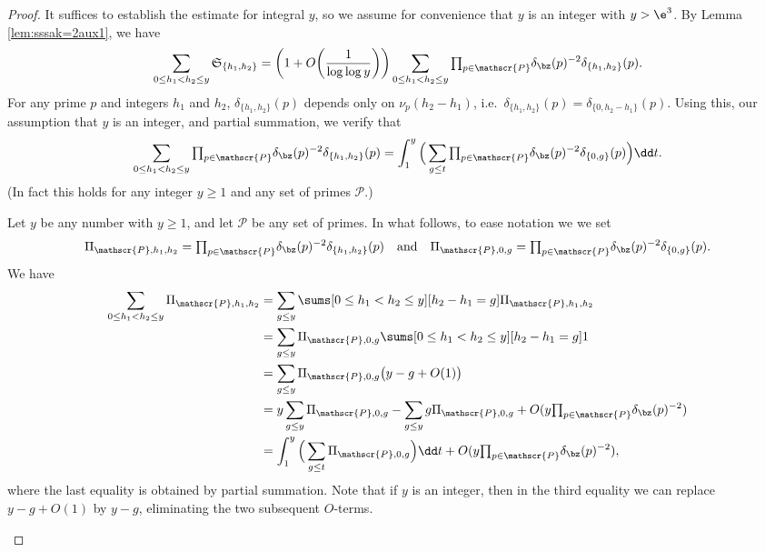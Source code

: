 \documentclass[12pt, reqno, twoside, letterpaper]{amsart}
\begin{document}
\begin{jetsam}
\begin{proof}
%
It suffices to establish the estimate for integral $y$, so we 
assume for convenience that $y$ is an integer with $y > \e^3$.
%
By Lemma \ref{lem:sssak=2aux1}, we have 
\begin{equation}
 \label{eq:sssak=2pf1}
 \sum_{0 \le h_1 < h_2 \le y}
  \mathfrak{S}_{\{h_1,h_2\}}
   =
    \bigg(1 + O\bigg(\frac{1}{\log\log y}\bigg)\bigg)
     \sum_{0 \le h_1 < h_2 \le y}
      {\textstyle \prod_{p \in \mathscr{P}} }
       \delta_{\bz}(p)^{-2}\delta_{\{h_1,h_2\}}(p).
\end{equation}
%
For any prime $p$ and integers $h_1$ and $h_2$, 
$\delta_{\{h_1,h_2\}}(p)$ depends only on $\nu_p(h_2 - h_1)$, 
i.e.\ $\delta_{\{h_1,h_2\}}(p) = \delta_{\{0,h_2 - h_1\}}(p)$.
%
Using this, our assumption that $y$ is an integer, and partial 
summation, we verify that  
\[
  \sum_{0 \le h_1 < h_2 \le y}
   {\textstyle \prod_{p \in \mathscr{P}} }
     \delta_{\bz}(p)^{-2}\delta_{\{h_1,h_2\}}(p)
  =
   \int_1^y 
    \Big(\sum_{g \le t} 
    {\textstyle \prod_{p \in \mathscr{P}} }
      \delta_{\bz}(p)^{-2}\delta_{\{0,g\}}(p)\Big) \dd t.
\]
%
(In fact this holds for any integer $y \ge 1$ and any set of 
primes $\mathscr{P}$.)
%
\begin{nixnix}
%
Let $y$ be any number with $y \ge 1$, and let $\mathscr{P}$ be any 
set of primes.
%
In what follows, to ease notation we we set 
\[
 \Pi_{\mathscr{P},h_1,h_2}
  = 
   {\textstyle \prod_{p \in \mathscr{P}} } \delta_{\bz}(p)^{-2}\delta_{\{h_1,h_2\}}(p)
    \quad 
     \text{and}
      \quad 
       \Pi_{\mathscr{P},0,g}
      = 
        {\textstyle \prod_{p \in \mathscr{P}} } \delta_{\bz}(p)^{-2}\delta_{\{0,g\}}(p).
\]
%
We have 
\begin{align*}
 \sum_{0 \le h_1 < h_2 \le y}
  \Pi_{\mathscr{P},h_1,h_2}
 & =
    \sum_{g \le y}
     \sums[0 \le h_1 < h_2 \le y][h_2 - h_1 = g] 
      \Pi_{\mathscr{P},h_1,h_2}
 \\
 & = 
        \sum_{g \le y} 
         \Pi_{\mathscr{P},0,g}
          \sums[0 \le h_1 < h_2 \le y][h_2 - h_1 = g] 1
 \\
 & =  
            \sum_{g \le y} 
             \Pi_{\mathscr{P},0,g}
              \big(y - g + O(1)\big)
 \\
 & = 
                y\sum_{g \le y}
                  \Pi_{\mathscr{P},0,g}
                 -
                   \sum_{g \le y} 
                   g\Pi_{\mathscr{P},0,g}
                  +
                     O(y{\textstyle \prod_{p \in \mathscr{P}} } \delta_{\bz}(p)^{-2})
 \\
 & = 
  \int_1^y 
   \Big(\sum_{g \le t} \Pi_{\mathscr{P},0,g}\Big) \dd t
    + 
     O(y{\textstyle \prod_{p \in \mathscr{P}} } \delta_{\bz}(p)^{-2}),
\end{align*}
where the last equality is obtained by partial summation.
%
Note that if $y$ is an integer, then in the third equality we can 
replace $y - g + O(1)$ by $y - g$, eliminating the two subsequent 
$O$-terms.
\end{nixnix}


\end{proof}
\end{jetsam}
\end{document}
